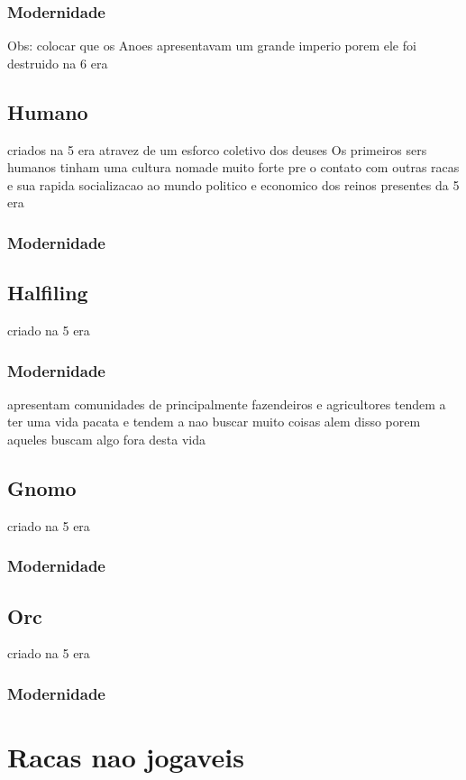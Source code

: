 \documentclass{book}
\begin{document}
\subsection*{Modernidade}

Obs: colocar que os Anoes apresentavam um grande imperio porem ele foi destruido na 6 era 

\section{Humano}
criados na 5 era atravez de um esforco coletivo dos deuses 
Os primeiros sers humanos tinham uma cultura nomade muito forte pre o contato com outras racas 
e sua rapida socializacao ao mundo politico e economico dos reinos presentes da 5 era

\subsection{Modernidade}

\section{Halfiling}
criado na 5 era 

\subsection{Modernidade}
apresentam comunidades de principalmente fazendeiros e agricultores tendem a ter uma vida pacata
e tendem a nao buscar muito coisas alem disso porem aqueles buscam algo fora desta vida 

\section{Gnomo}
criado na 5 era

\subsection{Modernidade}

\section{Orc}
criado na 5 era 
\subsection{Modernidade}

\chapter{Racas nao jogaveis}
\end{document}
